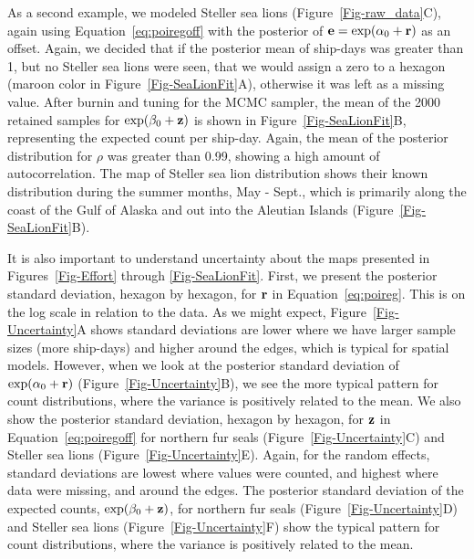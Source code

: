 \documentclass[11pt, titlepage]{article}
\begin{document}
\begin{spacing}{1.9}
\begin{flushleft}
As a second example, we modeled Steller sea lions (Figure~\ref{Fig-raw_data}C), again using Equation~\eqref{eq:poiregoff} with the posterior of $\mathbf{e} = \exp(\alpha_{0} + \mathbf{r})$ as an offset. Again, we decided that if the posterior mean of ship-days was greater than 1, but no Steller sea lions were seen, that we would assign a zero to a hexagon (maroon color in Figure~\ref{Fig-SeaLionFit}A), otherwise it was left as a missing value. After burnin and tuning for the MCMC sampler, the mean of the 2000 retained samples for $\exp(\beta_{0} + \mathbf{z})$ is shown in Figure~\ref{Fig-SeaLionFit}B, representing the expected count per ship-day. Again, the mean of the posterior distribution for $\rho$ was greater than 0.99, showing a high amount of autocorrelation. The map of Steller sea lion distribution shows their known distribution  during the summer months, May - Sept., which is primarily along the coast of the Gulf of Alaska and out into the Aleutian Islands (Figure~\ref{Fig-SeaLionFit}B).

It is also important to understand uncertainty about the maps presented in Figures~\ref{Fig-Effort} through \ref{Fig-SeaLionFit}.  First, we present the posterior standard deviation, hexagon by hexagon, for $\mathbf{r}$ in Equation~\eqref{eq:poireg}.  This is on the log scale in relation to the data.  As we might expect, Figure~\ref{Fig-Uncertainty}A shows standard deviations are lower where we have larger sample sizes (more ship-days) and higher around the edges, which is typical for spatial models.  However, when we look at the posterior standard deviation of $\exp(\alpha_{0} + \mathbf{r})$ (Figure~\ref{Fig-Uncertainty}B), we see the more typical pattern for count distributions, where the variance is positively related to the mean.  We also show the posterior standard deviation, hexagon by hexagon, for $\mathbf{z}$ in Equation~\eqref{eq:poiregoff} for northern fur seals (Figure~\ref{Fig-Uncertainty}C) and Steller sea lions (Figure~\ref{Fig-Uncertainty}E).  Again, for the random effects, standard deviations are lowest where values were counted, and highest where data were missing, and around the edges. The posterior standard deviation of the expected counts, $\exp(\beta_{0} + \mathbf{z})$, for northern fur seals (Figure~\ref{Fig-Uncertainty}D) and Steller sea lions (Figure~\ref{Fig-Uncertainty}F) show the typical pattern for count distributions, where the variance is positively related to the mean.    
 


\end{flushleft}
\end{spacing}
\end{document}
